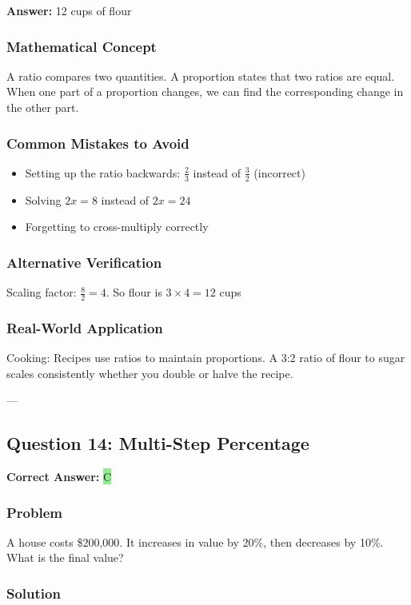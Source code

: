 \documentclass[12pt]{article}
\begin{document}
\textbf{Answer: } 12 cups of flour

\subsubsection*{Mathematical Concept}
A ratio compares two quantities. A proportion states that two ratios are equal. When one part of a proportion changes, we can find the corresponding change in the other part.

\subsubsection*{Common Mistakes to Avoid}
\begin{itemize}
\item Setting up the ratio backwards: $\frac{2}{3}$ instead of $\frac{3}{2}$ (incorrect)
\item Solving $2x = 8$ instead of $2x = 24$
\item Forgetting to cross-multiply correctly
\end{itemize}

\subsubsection*{Alternative Verification}
Scaling factor: $\frac{8}{2} = 4$. So flour is $3 \times 4 = 12$ cups 

\subsubsection*{Real-World Application}
Cooking: Recipes use ratios to maintain proportions. A 3:2 ratio of flour to sugar scales consistently whether you double or halve the recipe.

---

\subsection{Question 14: Multi-Step Percentage}

\textbf{Correct Answer: } \colorbox{lightgreen}{C}

\subsubsection*{Problem}
A house costs \$200,000. It increases in value by 20\%, then decreases by 10\%. What is the final value?

\subsubsection*{Solution}
\end{document}
